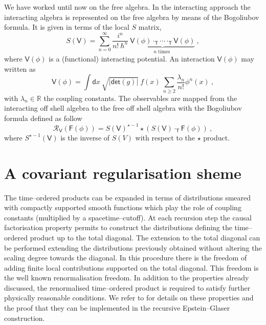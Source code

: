 \documentclass[10pt]{book}
\newcommand{\abs}[1]{\left|#1\right|}
\renewcommand{\det}{\mathsf{det}}
\let\int\int
\newcommand{\Rcal}{\mathcal{R}}
\newcommand{\Rbb}{\mathbb{R}}
\newcommand{\Fsf}{\mathsf{F}}
\newcommand{\Tsf}{\mathsf{T}}
\newcommand{\Vsf}{\mathsf{V}}
\newcommand{\dsf}{\mathsf{d}}
\theoremstyle{break}
\begin{document}
We have worked until now on the free algebra. In the interacting approach the interacting algebra is represented on the free algebra by means of the Bogoliubov formula. It is given in terms of the local $S$ matrix, 
%
\begin{equation*}
S(\Vsf) = \sum^\infty_{n=0} \frac{i^n}{n!\ \hbar^n} \ \underbrace{\Vsf(\phi) \cdot_\Tsf \cdots \cdot_\Tsf \Vsf(\phi)}_{n \mbox{ times }} \ ,
\end{equation*}
%
where $\Vsf(\phi)$ is a (functional) interacting potential. An interaction $\Vsf(\phi)$ may written as 
%
\begin{equation*}
\Vsf(\phi) = \int \dsf x \ \sqrt{\abs{\det(g)}} \ f(x) \ \sum_{n\geq 2} \frac{\lambda_n}{n!} \phi^n(x) \ ,
\end{equation*}
%
with $\lambda_n \in \Rbb$ the coupling constants. The observables are mapped from the interacting off shell algebra to the free off shell algebra with the Bogoliubov formula defined as follow 
%
\begin{equation*}
\Rcal_\Vsf(\Fsf(\phi)) = S(\Vsf)^{\star-1} \star \left( S(\Vsf) \cdot_\Tsf \Fsf(\phi) \right) \ ,
\end{equation*}
%
where $S^{\star-1}(\Vsf)$ is the inverse of $S(V)$ with respect to the $\star$ product. 


\chapter{A covariant regularisation sheme}


The time--ordered products can be expanded in terms of distributions smeared with compactly supported smooth functions which play the role of coupling constants (multiplied by a spacetime--cutoff). At each recursion step the causal factorisation property %
permits to construct the distributions defining the time--ordered product up to the total diagonal. 
The extension to the total diagonal can be performed extending the distributions previously obtained without altering the scaling degree towards the diagonal. In this procedure there is the freedom of adding finite local contributions supported on the total diagonal. This freedom is the well known renormalisation freedom. In addition to the properties already discussed, the renormalised time--ordered product is required to satisfy further physically reasonable conditions. We refer to %
for details on these properties and the proof that they can be implemented in the recursive Epstein--Glaser construction.
\end{document}
